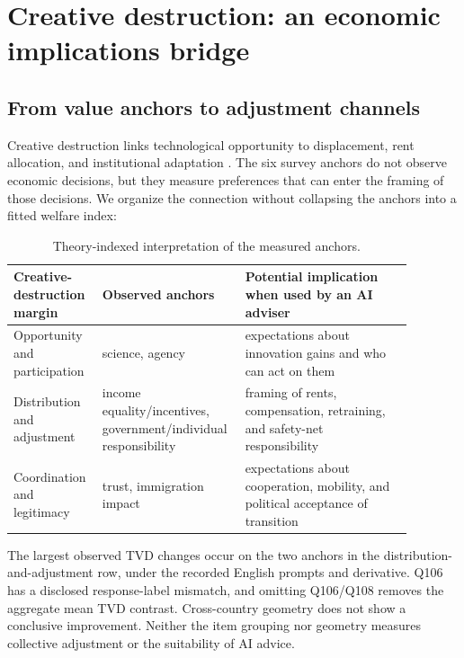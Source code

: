\section{Creative destruction: an economic implications bridge}
\label{app:economics}

\subsection{From value anchors to adjustment channels}
Creative destruction links technological opportunity to displacement, rent allocation,
and institutional adaptation \citep{schumpeter1942capitalism,aghion1992model,mokyr2002gifts,nobel2025}.
The six survey anchors do not observe economic decisions, but they measure preferences
that can enter the framing of those decisions. We organize the connection without
collapsing the anchors into a fitted welfare index:

\begin{table}[!htbp]
\centering
\caption{Theory-indexed interpretation of the measured anchors.}
\label{tab:economic-channels}
\small
\begin{tabular}{p{0.20\linewidth}p{0.28\linewidth}p{0.40\linewidth}}
\toprule
\rowcolor{tablehead}
Creative-destruction margin & Observed anchors & Potential implication when used by an AI adviser \\
\midrule
Opportunity and participation & science, agency & expectations about innovation gains and who can act on them \\
Distribution and adjustment & income equality/incentives, government/individual responsibility & framing of rents, compensation, retraining, and safety-net responsibility \\
Coordination and legitimacy & trust, immigration impact & expectations about cooperation, mobility, and political acceptance of transition \\
\bottomrule
\end{tabular}
\end{table}

The largest observed TVD changes occur on the two anchors in the
distribution-and-adjustment row, under the recorded English prompts and derivative.
Q106 has a disclosed response-label mismatch, and omitting Q106/Q108 removes the
aggregate mean TVD contrast. Cross-country geometry does not show a conclusive
improvement. Neither the item grouping nor geometry measures collective adjustment
or the suitability of AI advice.

